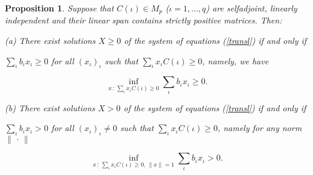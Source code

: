 \documentclass[12pt]{amsart}
\newtheorem{proposition}[theorem]{Proposition}
\theoremstyle{definition}
\begin{document}
\begin{proposition}\label{p:test}
Suppose that $C(\iota ) \in M_p$ ($\iota =1,\ldots ,q$) are selfadjoint,  linearly 
independent and their linear span contains strictly positive matrices. Then:

\emph{(a)} There exist solutions $X\geq 0$ of the system of equations (\ref{transl}) if
and only if

\noindent $\sum_\iota b_\iota x_\iota  \geq 0$ for all $(x_\iota )_{\iota}$ such that 
$\sum_\iota x_\iota C(\iota ) \geq 0$, namely, we have

$$\inf_{x\, :\, \sum_\iota x_\iota C(\iota ) \geq 0}\sum_\iota b_\iota x_\iota \geq 0.$$

\emph{(b)} There exist solutions $X> 0$ of the system of equations (\ref{transl}) if
and only if

\noindent $\sum_\iota b_\iota x_\iota  > 0$ for all $(x_\iota )_{\iota}\not =0$ such that $\sum_\iota x_\iota C(\iota ) \geq 0$, namely for any
norm  $\| \, \cdot\, \|$ 

$$\inf_{x\, :\, \sum_\iota x_\iota C(\iota ) \geq 0,\, \| x\| =1}\sum_\iota b_\iota x_\iota >0.$$
\end{proposition}
\end{document}
